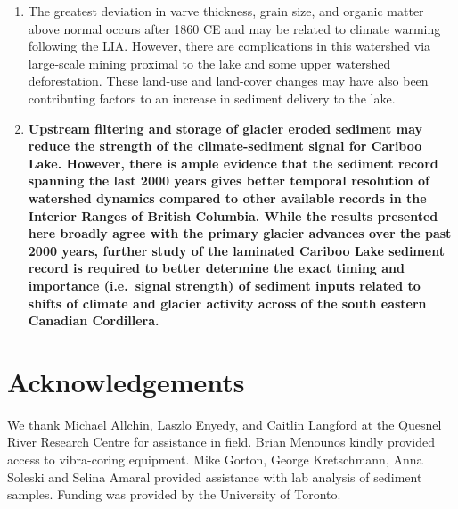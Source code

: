\documentclass[Royal,times,doublespace,sageh]{sagej}
\begin{document}
\begin{enumerate}
{  (\textasciitilde1600 to 1900 CE) are best correlated with grain size
  in Cariboo Lake. The trends in varve thickness were not as strong but
  still help confirm trends observed in grain size. Organic matter
  content is the least correlated with the other sediment metrics and
  may be more sensitive to vegetation changes in the basin. We conclude
  that sediment accumulation in Cariboo Lake was more sensitive to
  glacier activity and sediment production during the LIA compared to
  earlier advances.}
\item
  The greatest deviation in varve thickness, grain size, and organic
  matter above normal occurs after 1860 CE and may be related to climate
  warming following the LIA. However, there are complications in this
  watershed via large-scale mining proximal to the lake and some upper
  watershed deforestation. These land-use and land-cover changes may
  have also been contributing factors to an increase in sediment
  delivery to the lake.
\item
  \textbf{Upstream filtering and storage of glacier eroded sediment may
  reduce the strength of the climate-sediment signal for Cariboo Lake.
  However, there is ample evidence that the sediment record spanning the
  last 2000 years gives better temporal resolution of watershed dynamics
  compared to other available records in the Interior Ranges of British
  Columbia. While the results presented here broadly agree with the
  primary glacier advances over the past 2000 years, further study of
  the laminated Cariboo Lake sediment record is required to better
  determine the exact timing and importance (i.e.~signal strength) of
  sediment inputs related to shifts of climate and glacier activity
  across of the south eastern Canadian Cordillera.}
\end{enumerate}

\pagebreak

\hypertarget{acknowledgements}{%
\section{Acknowledgements}\label{acknowledgements}}

We thank Michael Allchin, Laszlo Enyedy, and Caitlin Langford at the
Quesnel River Research Centre for assistance in field. Brian Menounos
kindly provided access to vibra-coring equipment. Mike Gorton, George
Kretschmann, Anna Soleski and Selina Amaral provided assistance with lab
analysis of sediment samples. Funding was provided by the University of
Toronto.

\pagebreak



\end{document}
